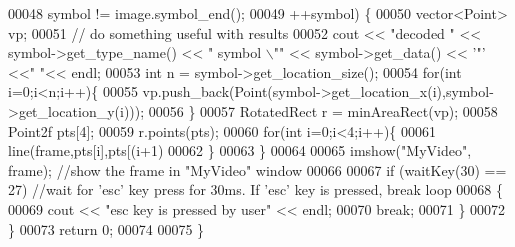\begin{DoxyCode}
00048                 symbol != image.symbol\_end();  
00049                 ++symbol) \{  
00050             vector<Point> vp;  
00051             \textcolor{comment}{// do something useful with results  }
00052             cout << \textcolor{stringliteral}{"decoded "} << symbol->get\_type\_name()  << \textcolor{stringliteral}{" symbol \(\backslash\)""} << symbol->get\_data() << \textcolor{charliteral}{'"'} <<\textcolor{stringliteral}{"
       "}<< endl;  
00053             \textcolor{keywordtype}{int} n = symbol->get\_location\_size();  
00054             \textcolor{keywordflow}{for}(\textcolor{keywordtype}{int} i=0;i<n;i++)\{  
00055                 vp.push\_back(Point(symbol->get\_location\_x(i),symbol->get\_location\_y(i))); 
00056             \}  
00057             RotatedRect r = minAreaRect(vp);  
00058             Point2f pts[4];  
00059             r.points(pts);  
00060             \textcolor{keywordflow}{for}(\textcolor{keywordtype}{int} i=0;i<4;i++)\{  
00061                 line(frame,pts[i],pts[(i+1)%
00062             \}  
00063         \}  
00064 
00065         imshow(\textcolor{stringliteral}{"MyVideo"}, frame); \textcolor{comment}{//show the frame in "MyVideo" window}
00066 
00067         \textcolor{keywordflow}{if} (waitKey(30) == 27) \textcolor{comment}{//wait for 'esc' key press for 30ms. If 'esc' key is pressed, break loop}
00068         \{
00069             cout << \textcolor{stringliteral}{"esc key is pressed by user"} << endl;
00070             \textcolor{keywordflow}{break}; 
00071         \}
00072     \}
00073     \textcolor{keywordflow}{return} 0;
00074 
00075 \}
\end{DoxyCode}
